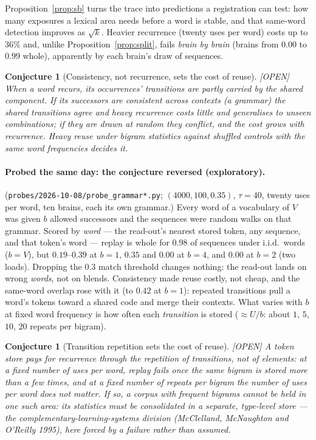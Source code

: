 \documentclass[11pt]{article}
\theoremstyle{definition}
\theoremstyle{plain}
\newtheorem{conjecture}[lemma]{Conjecture}
\newcommand{\OPEN}{\textnormal{\footnotesize\textsf{[OPEN]}}}
\begin{document}
Proposition~\ref{prop:sb} turns the trace into predictions a registration can
test: how many exposures a lexical area needs before a word is stable, and that
same-word detection improves as $\sqrt{k}$. Heavier recurrence (twenty uses per
word) costs up to $36\%$ and, unlike Proposition~\ref{prop:split}, fails
\emph{brain by brain} (brains from $0.00$ to $0.99$ whole), apparently by each
brain's draw of sequences.

\begin{conjecture}[Consistency, not recurrence, sets the cost of reuse]\label{conj:grammar} \OPEN
When a word recurs, its occurrences' transitions are partly carried by the
shared component. If its successors are consistent across contexts (a grammar)
the shared transitions agree and heavy recurrence costs little and generalises
to unseen combinations; if they are drawn at random they conflict, and the cost
grows with recurrence. Heavy reuse under bigram statistics against shuffled
controls with the same word frequencies decides it.
\end{conjecture}

\paragraph{Probed the same day: the conjecture reversed (exploratory).}
(\texttt{probes/2026-10-08/probe\_grammar*.py}; $(4000,100,0.35)$, $\tau = 40$,
twenty uses per word, ten brains, each its own grammar.) Every word of a
vocabulary of $V$ was given $b$ allowed successors and the sequences were random
walks on that grammar. Scored by \emph{word} --- the read-out's nearest stored
token, any sequence, and that token's word --- replay is whole for $0.98$ of
sequences under i.i.d.\ words ($b = V$), but $0.19$--$0.39$ at $b = 1$, $0.35$ and
$0.00$ at $b = 4$, and $0.00$ at $b = 2$ (two loads). Dropping the $0.3$ match
threshold changes nothing: the read-out lands on wrong \emph{words}, not on
blends. Consistency made reuse costly, not cheap, and the same-word overlap
rose with it (to $0.42$ at $b = 1$): repeated transitions pull a word's tokens
toward a shared code and merge their contexts. What varies with $b$ at fixed
word frequency is how often each \emph{transition} is stored ($\approx U/b$:
about $1$, $5$, $10$, $20$ repeats per bigram).

\begin{conjecture}[Transition repetition sets the cost of reuse]\label{conj:bigram} \OPEN
A token store pays for recurrence through the repetition of transitions, not
of elements: at a fixed number of uses per word, replay fails once the same
bigram is stored more than a few times, and at a fixed number of repeats per
bigram the number of uses per word does not matter. If so, a corpus with
frequent bigrams cannot be held in one such area: its statistics must be
consolidated in a separate, type-level store --- the complementary-learning-systems
division (McClelland, McNaughton and O'Reilly 1995), here forced by a failure rather than assumed.
\end{conjecture}
\end{document}
